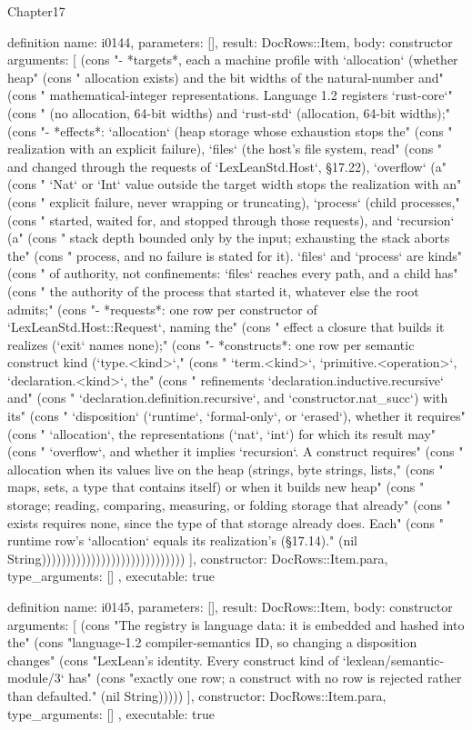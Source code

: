 \begin{lexlean}{Chapter17}
\begin{semanticmodule}
definition{
  name: i0144,
  parameters: [],
  result: DocRows::Item,
  body: constructor{
    arguments: [
      (cons "- *targets*, each a machine profile with `allocation` (whether heap" (cons "  allocation exists) and the bit widths of the natural-number and" (cons "  mathematical-integer representations. Language 1.2 registers `rust-core`" (cons "  (no allocation, 64-bit widths) and `rust-std` (allocation, 64-bit widths);" (cons "- *effects*: `allocation` (heap storage whose exhaustion stops the" (cons "  realization with an explicit failure), `files` (the host's file system, read" (cons "  and changed through the requests of `LexLeanStd.Host`, §17.22), `overflow` (a" (cons "  `Nat` or `Int` value outside the target width stops the realization with an" (cons "  explicit failure, never wrapping or truncating), `process` (child processes," (cons "  started, waited for, and stopped through those requests), and `recursion` (a" (cons "  stack depth bounded only by the input; exhausting the stack aborts the" (cons "  process, and no failure is stated for it). `files` and `process` are kinds" (cons "  of authority, not confinements: `files` reaches every path, and a child has" (cons "  the authority of the process that started it, whatever else the root admits;" (cons "- *requests*: one row per constructor of `LexLeanStd.Host::Request`, naming the" (cons "  effect a closure that builds it realizes (`exit` names none);" (cons "- *constructs*: one row per semantic construct kind (`type.<kind>`," (cons "  `term.<kind>`, `primitive.<operation>`, `declaration.<kind>`, the" (cons "  refinements `declaration.inductive.recursive` and" (cons "  `declaration.definition.recursive`, and `constructor.nat_succ`) with its" (cons "  `disposition` (`runtime`, `formal-only`, or `erased`), whether it requires" (cons "  `allocation`, the representations (`nat`, `int`) for which its result may" (cons "  `overflow`, and whether it implies `recursion`. A construct requires" (cons "  allocation when its values live on the heap (strings, byte strings, lists," (cons "  maps, sets, a type that contains itself) or when it builds new heap" (cons "  storage; reading, comparing, measuring, or folding storage that already" (cons "  exists requires none, since the type of that storage already does. Each" (cons "  runtime row's `allocation` equals its realization's (§17.14)." (nil String)))))))))))))))))))))))))))))
    ],
    constructor: DocRows::Item.para,
    type_arguments: []
  },
  executable: true
}

definition{
  name: i0145,
  parameters: [],
  result: DocRows::Item,
  body: constructor{
    arguments: [
      (cons "The registry is language data: it is embedded and hashed into the" (cons "language-1.2 compiler-semantics ID, so changing a disposition changes" (cons "LexLean's identity. Every construct kind of `lexlean/semantic-module/3` has" (cons "exactly one row; a construct with no row is rejected rather than defaulted." (nil String)))))
    ],
    constructor: DocRows::Item.para,
    type_arguments: []
  },
  executable: true
}


\end{semanticmodule}
\end{lexlean}
